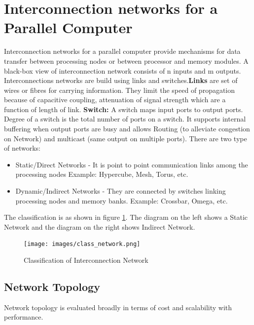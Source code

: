 \documentclass[12pt]{book}
\begin{document}
\section{Interconnection networks for a Parallel Computer}
Interconnection networks for a parallel computer provide mechanisms for data transfer between processing nodes or between
processor and memory modules. A black-box view of interconnection network consists of n inputs and m outputs. Interconnections networks are build using links and switches.\textbf{Links} are set of wires 
or fibres for carrying information. They limit the speed of propagation because of capacitive coupling, attenuation of signal strength 
which are a function of length of link. \textbf{Switch: }A switch maps input ports to output ports. Degree of a switch is the total number of ports on a switch.
It supports internal buffering when output ports are busy and allows Routing (to alleviate congestion on Network) and 
multicast (same output on multiple ports). There are two type of networks:
\begin{itemize}
    \item Static/Direct Networks - It is point to point communication links among the processing nodes Example: Hypercube, Mesh, Torus, etc.
    \item Dynamic/Indirect Networks - They are connected by switches linking processing nodes and memory banks. Example: Crossbar, Omega, etc.
\end{itemize}
The classification is as shown in figure \ref{fig:class_network}. The diagram on the left shows a Static Network and the diagram on the right shows Indirect Network.
\begin{figure}[H]
    \centering
    \texttt{[image: images/class\_network.png]}
    \caption{Classification of Interconnection Network}
    \label{fig:class_network}
\end{figure}

\subsection{Network Topology}
Network topology is evaluated broadly in terms of cost and scalability with performance.
\end{document}
